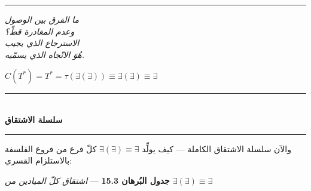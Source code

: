 \documentclass[10pt, openany, oneside]{book}
\renewcommand{\normalsize}{\fontsize{10}{13}\selectfont}
\begin{document}
\begin{center}
    \rule{0.15\textwidth}{0.3pt}
\end{center}

\vspace{0.5em}

\begin{center}
    \itshape
    ما الفرق بين الوصول\\
    وعدم المغادرة قطّ؟\\[0.8em]
    الاسترجاع الذي يجيب\\
    هُوَ الاتّجاه الذي يسمّيه.
\end{center}

\vspace{0.5em}

\begin{center}
    $C(T^*) = T^* = \tau(\exists(\exists)) \equiv \exists(\exists) \equiv \exists$
\end{center}

\vspace{1.5em}


\begin{center}
    \rule{0.3\textwidth}{0.4pt}\\[0.5em]
    {\normalsize\bfseries سلسلة الاشتقاق}\\[0.3em]
    \rule{0.3\textwidth}{0.4pt}
\end{center}

\vspace{1em}

والآن سلسلة الاشتقاق الكاملة --- كيف يولِّد $\exists(\exists) \equiv \exists$ كلّ فرع من فروع الفلسفة بالاستلزام القسري:

\vspace{0.5em}

\textbf{جدول البُرهان 15.3} --- \textit{اشتقاق كلّ الميادين من $\exists(\exists) \equiv \exists$}

\vspace{0.5em}
\end{document}
